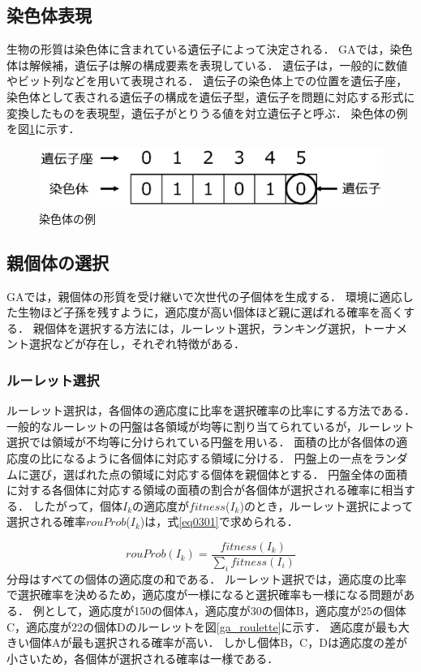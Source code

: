 \subsection{染色体表現}
生物の形質は染色体に含まれている遺伝子によって決定される．
GAでは，染色体は解候補，遺伝子は解の構成要素を表現している．
遺伝子は，一般的に数値やビット列などを用いて表現される．
遺伝子の染色体上での位置を遺伝子座，染色体として表される遺伝子の構成を遺伝子型，遺伝子を問題に対応する形式に変換したものを表現型，遺伝子がとりうる値を対立遺伝子と呼ぶ．
染色体の例を図\ref{ga_chrom}に示す．

\begin{figure}[t]
    \begin{center}
    \includegraphics[scale=0.6]{image/ga_chrom.eps}
    \caption{染色体の例}
    \label{ga_chrom}
    \end{center}
\end{figure}

\subsection{親個体の選択}
GAでは，親個体の形質を受け継いで次世代の子個体を生成する．
環境に適応した生物ほど子孫を残すように，適応度が高い個体ほど親に選ばれる確率を高くする．
親個体を選択する方法には，ルーレット選択，ランキング選択，トーナメント選択などが存在し，それぞれ特徴がある．

\subsubsection{ルーレット選択}
ルーレット選択は，各個体の適応度に比率を選択確率の比率にする方法である．
一般的なルーレットの円盤は各領域が均等に割り当てられているが，ルーレット選択では領域が不均等に分けられている円盤を用いる．
面積の比が各個体の適応度の比になるように各個体に対応する領域に分ける．
円盤上の一点をランダムに選び，選ばれた点の領域に対応する個体を親個体とする．
円盤全体の面積に対する各個体に対応する領域の面積の割合が各個体が選択される確率に相当する．
したがって，個体$I_k$の適応度が$fitness$(${ I_k}$)のとき，ルーレット選択によって選択される確率$rouProb$(${I_k}$)は，式\ref{eq0301}で求められる．

    \begin{equation}\label{eq0301}
        {rouProb}({I_k}) = \frac{{fitness}({I_k})} {\displaystyle\sum_i{{fitness}({I_i})}}
    \end{equation}
分母はすべての個体の適応度の和である．
ルーレット選択では，適応度の比率で選択確率を決めるため，適応度が一様になると選択確率も一様になる問題がある．
例として，適応度が150の個体A，適応度が30の個体B，適応度が25の個体C，適応度が22の個体Dのルーレットを図\ref{ga_roulette}に示す．
適応度が最も大きい個体Aが最も選択される確率が高い．
しかし個体B，C，Dは適応度の差が小さいため，各個体が選択される確率は一様である．

